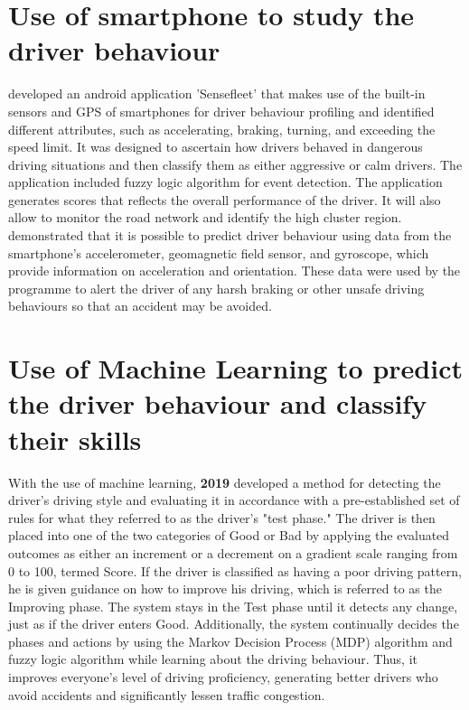 \documentclass[12pt,letterpaper]{report}
\begin{document}
\section{Use of smartphone to study the driver behaviour}
\textbf{\cite{castignani2015driver}} developed an android application 'Sensefleet' that makes use of the built-in sensors and GPS of smartphones for driver behaviour profiling and identified different attributes, such as accelerating, braking, turning, and exceeding the speed limit. It was designed to ascertain how drivers behaved in dangerous driving situations and then classify them as either aggressive or calm drivers. The application included fuzzy logic algorithm for event detection. The application generates scores that reflects the overall performance of the driver. It will also allow to monitor the road network and identify the high cluster region. 
\textbf{\cite{vavouranakis2017recognizing}} demonstrated that it is possible to predict driver behaviour using data from the smartphone's accelerometer, geomagnetic field sensor, and gyroscope, which provide information on acceleration and orientation. These data were used by the programme to alert the driver of any harsh braking or other unsafe driving behaviours so that an accident may be avoided.\\


\section{Use of Machine Learning to predict the driver behaviour and classify their skills}
With the use of machine learning, \textbf{\cite{subramanianintelligent} 2019} developed a method for detecting the driver's driving style and evaluating it in accordance with a pre-established set of rules for what they referred to as the driver's "test phase." The driver is then placed into one of the two categories of Good or Bad by applying the evaluated outcomes as either an increment or a decrement on a gradient scale ranging from 0 to 100, termed Score. If the driver is classified as having a poor driving pattern, he is given guidance on how to improve his driving, which is referred to as the Improving phase. The system stays in the Test phase until it detects any change, just as if the driver enters Good. Additionally, the system continually decides the phases and actions by using the Markov Decision Process (MDP) algorithm and fuzzy logic algorithm while learning about the driving behaviour. Thus, it improves everyone's level of driving proficiency, generating better drivers who avoid accidents and significantly lessen traffic congestion.\\
\end{document}
